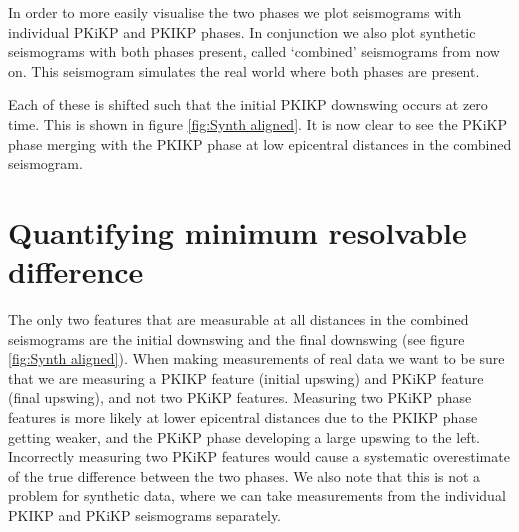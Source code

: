 \documentclass[11pt,a4paper]{article}
\begin{document}
In order to more easily visualise the two phases we plot seismograms with individual PKiKP and PKIKP phases. In conjunction we also plot synthetic seismograms with both phases present, called `combined' seismograms from now on. This seismogram simulates the real world where both phases are present.

Each of these is shifted such that the initial PKIKP downswing occurs at zero time. This is shown in figure \ref{fig:Synth aligned}. It is now clear to see the PKiKP phase merging with the PKIKP phase at low epicentral distances in the combined seismogram.

\section{Quantifying minimum resolvable difference}
The only two features that are measurable at all distances in the combined seismograms are the initial downswing and the final downswing (see figure \ref{fig:Synth aligned}). When making measurements of real data we want to be sure that we are measuring a PKIKP feature (initial upswing) and PKiKP feature (final upswing), and not two PKiKP features. Measuring two PKiKP phase features is more likely at lower epicentral distances due to the PKIKP phase getting weaker, and the PKiKP phase developing a large upswing to the left. Incorrectly measuring two PKiKP features would cause a systematic overestimate of the true difference between the two phases. We also note that this is not a problem for synthetic data, where we can take measurements from the individual PKIKP and PKiKP seismograms separately.
\end{document}
